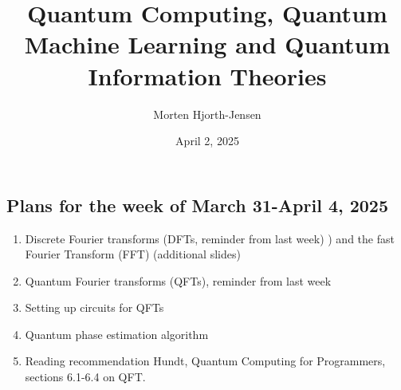 \documentclass[%
oneside,                 %
final,                   %
10pt]{article}
\begin{document}

\newcommand{\exercisesection}[1]{\subsection*{#1}}






\title{Quantum Computing, Quantum Machine Learning and Quantum Information Theories}


\author{Morten Hjorth-Jensen}

\date{April 2, 2025
}

\subsection{Plans for the week of March 31-April 4, 2025}

\begin{block}{}
\begin{enumerate}
\item Discrete Fourier transforms (DFTs, reminder from last week) ) and the fast Fourier Transform (FFT) (additional slides)

\item Quantum Fourier transforms (QFTs), reminder from last week

\item Setting up circuits for QFTs

\item Quantum phase estimation algorithm

\item Reading recommendation Hundt, Quantum Computing for Programmers, sections 6.1-6.4 on QFT.
\end{enumerate}

\noindent
\end{block}
\end{document}
